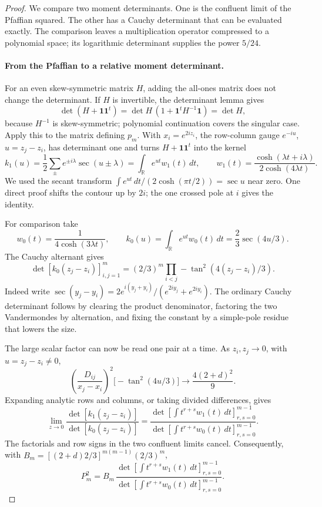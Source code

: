 \begin{proof}
We compare two moment determinants. One is the confluent limit of the
Pfaffian squared. The other has a Cauchy determinant that can be evaluated
exactly. The comparison leaves a multiplication operator compressed to a
polynomial space; its logarithmic determinant supplies the power \(5/24\).

\paragraph{From the Pfaffian to a relative moment determinant.}
For an even skew-symmetric matrix \(H\), adding the all-ones matrix
does not change the determinant. If \(H\) is invertible, the determinant
lemma gives
\[
 \det(H+\mathbf1\mathbf1^t)
 =\det H\,(1+\mathbf1^tH^{-1}\mathbf1)=\det H,
\]
because \(H^{-1}\) is skew-symmetric; polynomial continuation covers
the singular case. Apply this to the matrix defining \(p_m\). With
\(x_i=e^{2iz_i}\), the row-column gauge \(e^{-iu}\),
\(u=z_j-z_i\), has determinant one and turns \(H+\mathbf1\mathbf1^t\)
into the kernel
\[
 k_1(u)=\frac12\sum_{\pm}e^{\pm i\lambda}\sec(u\pm\lambda)
       =\int_{\mathbb R} e^{ut}w_1(t)\,dt,
 \qquad
 w_1(t)=\frac{\cosh(\lambda t+i\lambda)}{2\cosh(4\lambda t)}.
\]
We used the secant transform
\(\int e^{ut}\,dt/(2\cosh(\pi t/2))=\sec u\) near zero.
One direct proof shifts the contour up by \(2i\); the one crossed pole
at \(i\) gives the identity.

For comparison take
\[
 w_0(t)=\frac1{4\cosh(3\lambda t)},\qquad
 k_0(u)=\int_{\mathbb R}e^{ut}w_0(t)\,dt
       =\frac23\sec(4u/3).
\]
The Cauchy alternant gives
\[
 \det[k_0(z_j-z_i)]_{i,j=1}^m
   =(2/3)^m\prod_{i<j}-\tan^2(4(z_j-z_i)/3).
\]
Indeed write
\(\sec(y_j-y_i)=2e^{i(y_j+y_i)}/(e^{2iy_j}+e^{2iy_i})\).
The ordinary Cauchy determinant follows by clearing the product
denominator, factoring the two Vandermondes by alternation, and fixing
the constant by a simple-pole residue that lowers the size.

The large scalar factor can now be read one pair at a time. As
\(z_i,z_j\to0\), with \(u=z_j-z_i\ne0\),
\[
 \left(\frac{D_{ij}}{x_j-x_i}\right)^2
 \big[-\tan^2(4u/3)\big]
 \longrightarrow \frac{4(2+d)^2}{9}.
\]
Expanding analytic rows and columns, or taking divided differences, gives
\[
 \lim_{z\to0}
 \frac{\det[k_1(z_j-z_i)]}{\det[k_0(z_j-z_i)]}
 =\frac{\det[\int t^{r+s}w_1(t)\,dt]_{r,s=0}^{m-1}}
        {\det[\int t^{r+s}w_0(t)\,dt]_{r,s=0}^{m-1}}.
\]
The factorials and row signs in the two confluent limits cancel.
Consequently, with
\(B_m=[(2+d)2/3]^{m(m-1)}(2/3)^m\),
\begin{equation}
 P_m^2=B_m\,
 \frac{\det[\int t^{r+s}w_1(t)\,dt]_{r,s=0}^{m-1}}
      {\det[\int t^{r+s}w_0(t)\,dt]_{r,s=0}^{m-1}}.
 \label{c2:eq-relative-moment}
\end{equation}


\end{proof}
